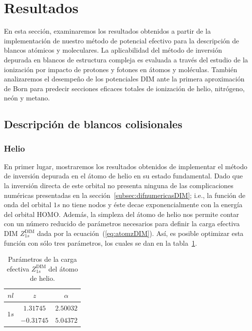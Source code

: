 \section{Resultados}

En esta sección, examinaremos los resultados obtenidos a partir de la 
implementación de nuestro método de potencial efectivo para la descripción 
de blancos atómicos y moleculares. 
La aplicabilidad del método de inversión depurada en blancos de 
estructura compleja es evaluada a través del estudio de la ionización 
por impacto de protones y fotones en átomos y moléculas. También 
analizaremos el desempeño de los potenciales DIM ante la primera 
aproximación de Born para predecir secciones eficaces totales de 
ionización de helio, nitrógeno, neón y metano.

\subsection{Descripción de blancos colisionales}
\subsubsection{Helio}

En primer lugar, mostraremos los resultados obtenidos de implementar
el método de inversión depurada en el átomo de helio en su estado
fundamental. Dado que la inversión directa de este orbital no presenta 
ninguna de las complicaciones numéricas presentadas en la
sección~\ref{subsec:difnumericasDIM}; i.e., la función de onda del 
orbital $1s$ no tiene nodos y éste decae exponencialmente con la energía 
del orbital HOMO. Además, la simpleza del átomo de helio nos permite contar 
con un número reducido de parámetros necesarios para definir la carga 
efectiva DIM $Z_{1s}^{\mathrm{ DIM}}$ dada por la 
ecuación~(\ref{eq:atomzDIM}). Así, es posible optimizar esta función 
con sólo tres parámetros, los cuales se dan en la tabla~\ref{tab:parametrosHe}.

\begin{table}
\begin{center}
\begin{tabular}{|c|c|c|}
\hline
  $nl$ & $z$ & $\alpha$ \\
\hline
\hline
\multirow{2}{*}{$1s$} &  $1.31745$ & $2.50032$ \\
                      & $-0.31745$ & $5.04372$ \\
\hline
\end{tabular}
\caption[Parámetros de la carga efectiva del helio.]
{Parámetros de la carga efectiva $Z_{1s}^{\mathrm{ DIM}}$ del átomo de 
helio.}
\label{tab:parametrosHe}
\end{center}
\end{table}

